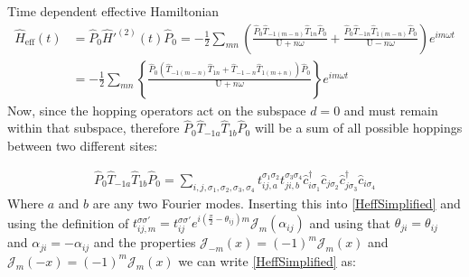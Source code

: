 \begin{section}{Time dependent effective Hamiltonian}
\begin{align}
\hat{H}_{\text{eff}}(t) &= \hat{P}_0\hat{H}'^{(2)}(t)\hat{P}_0 = -\frac{1}{2}\sum_{mn} \left( \frac{\hat{P}_0  \hat{T}_{-1(m-n)}\hat{T}_{1n}\hat{P}_0}{\text{U}+n\omega} + \frac{\hat{P}_0 \hat{T}_{-1n} \hat{T}_{1(m-n)} \hat{P}_0}{\text{U}-n\omega} \right) e^{im\omega t} \nonumber \\
&= -\frac{1}{2}\sum_{mn} \left\{ \frac{\hat{P}_0  (\hat{T}_{-1(m-n)}\hat{T}_{1n} + \hat{T}_{-1-n}\hat{T}_{1(m+n)})\hat{P}_0}{\text{U}+n\omega} \right\} e^{im\omega t} \label{2ndOHeff}
\end{align}
Now, since the hopping operators act on the subspace $d=0$ and must remain within that subspace, therefore $\hat{P}_0 \hat{T}_{-1a} \hat{T}_{1b} \hat{P}_0$ will be a sum of all possible hoppings between two different sites:

\begin{align*}
\hat{P}_0 \hat{T}_{-1a} \hat{T}_{1b} \hat{P}_0 = \sum_{i,j, \sigma_1, \sigma_2, \sigma_3, \sigma_4} t_{ij,a}^{\sigma_1 \sigma_2} t_{ji,b}^{\sigma_3 \sigma_4} \hat{c}_{i \sigma_1}^\dagger \hat{c}_{j \sigma_2} \hat{c}_{j \sigma_3}^\dagger \hat{c}_{i \sigma_4}
\end{align*}
Where $a$ and $b$ are any two Fourier modes. Inserting this into \ref{HeffSimplified} and using the definition of $t_{ij,m}^{\sigma \sigma'} = t_{ij}^{\sigma \sigma'} e^{i(\frac{\pi}{2}-\theta_{ij})m} \mathcal{J}_m(\alpha_{ij})$ and using that $\theta_{ji} = \theta_{ij}$ and $\alpha_{ji} = -\alpha_{ij}$ and the properties $\mathcal{J}_{-m}(x) = (-1)^m\mathcal{J}_m(x)$ and $\mathcal{J}_m(-x) = (-1)^m\mathcal{J}_m(x)$ we can write \ref{HeffSimplified} as:


\end{section}

